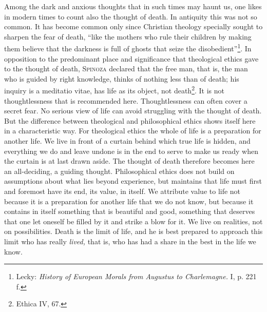 \documentclass[12pt,a4paper,openany]{book}
\newcommand{\opage}[1]{\marginnote{\footnotesize\textit{[#1]}}}
\begin{document}
Among the dark and anxious thoughts that in such times
\opage{197}may haunt us, one likes in modern times to count also the thought of death. In antiquity this was not
so common. It has become common only since Christian theology specially sought to sharpen the fear of death,
``like the mothers who rule their children by making them believe that the darkness is full of ghosts that
seize the disobedient''\footnote[1]{Lecky: \textit{History of European Morals from Augustus to Charlemagne.} I,
p. 221 f.}. %
In opposition to the predominant place and significance that theological ethics gave to the thought of death,
\textsc{Spinoza} declared that the free man, that is, the man who is guided by right knowledge, thinks of nothing
less than of death; his inquiry is a meditatio vitae, has life as its object, not death\footnote[2]{Ethica IV,
67.}. It is not thoughtlessness that is recommended here. Thoughtlessness can often cover a secret fear. No
serious view of life can avoid struggling with the thought of death. But the difference between theological and
philosophical ethics shows itself here in a characteristic way. For theological ethics the whole of life is a
preparation for another life. We live in front of a curtain behind which true life is hidden, and everything we
do and leave undone is in the end to serve to make us ready when the curtain is at last drawn aside. The thought
of death therefore becomes here an all-deciding, a guiding thought. Philosophical ethics does not build on
assumptions about what lies beyond experience, but maintains that life must first and foremost have its end, its
value, in itself. We attribute value to life not because it is a preparation for another life that we do not
know, but because it contains in itself something that is beautiful and good, something that deserves that one
let oneself be filled by it and strike a blow for it. We live on realities, not on possibilities. Death is the
limit of life, and he is best prepared to approach this limit who has really \textit{lived,} that is, who has had
a share in the best in the life we know.
\end{document}
